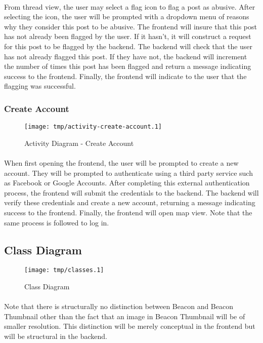         \paragraph*{}
        From thread view, the user may select a flag icon to flag a post as abusive.
        After selecting the icon, the user will be prompted with a dropdown menu of
        reasons why they consider this post to be abusive. The frontend will insure
        that this post has not already been flagged by the user. If it hasn't, it will
        construct a request for this post to be flagged by the backend. The backend
        will check that the user has not already flagged this post. If they have not,
        the backend will increment the number of times this post has been flagged and
        return a message indicating success to the frontend. Finally, the frontend will
        indicate to the user that the flagging was successful.
        
        \subsubsection{Create Account}
        \begin{figure}[H]
            \centering
            \texttt{[image: tmp/activity-create-account.1]} 
            \caption{Activity Diagram - Create Account}
        \end{figure}

        \paragraph*{}
        When first opening the frontend, the user will be prompted to create a new
        account. They will be prompted to authenticate using a third party service
        such as Facebook or Google Accounts. After completing this external
        authentication process, the frontend will submit the credentials to the
        backend. The backend will verify these credentials and create a new account,
        returning a message indicating success to the frontend. Finally, the frontend
        will open map view. Note that the same process is followed to log in.

    \subsection{Class Diagram}
        \begin{figure}[H]
            \centering
            \texttt{[image: tmp/classes.1]} 
            \caption{Class Diagram}
        \end{figure}

        \paragraph*{}
        Note that there is 
        structurally no distinction between Beacon and Beacon Thumbnail other 
        than the fact that an image in Beacon Thumbnail will be of smaller resolution. 
        This distinction will be merely conceptual in the frontend but will be 
        structural in the backend. 



